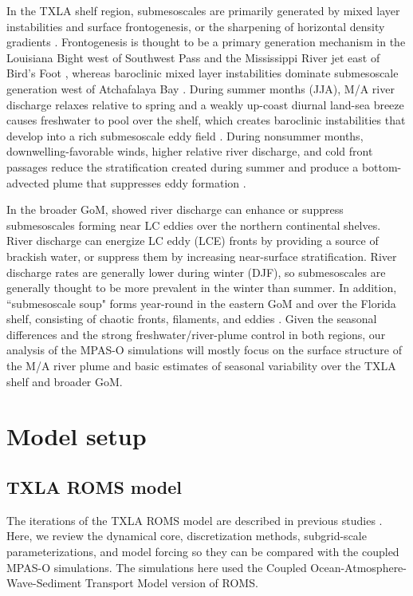 In the TXLA shelf region, submesoscales are primarily generated by mixed layer instabilities and surface frontogenesis, or the sharpening of horizontal density gradients \citep{hoskins1982mathematical, mcwilliams2021oceanic}. Frontogenesis is thought to be a primary generation mechanism in the Louisiana Bight west of Southwest Pass and the Mississippi River jet east of Bird's Foot \citep{Barkan_2017, wang2021structure}, whereas baroclinic mixed layer instabilities dominate submesoscale generation west of Atchafalaya Bay \citep{Hetland_2017, Schlichting23}. During summer months (JJA), M/A river discharge relaxes relative to spring and a weakly up-coast diurnal land-sea breeze causes freshwater to pool over the shelf, which creates baroclinic instabilities that develop into a rich submesoscale eddy field \citep{Hetland_2017, Kobashi_2020, Schlichting23}. During nonsummer months, downwelling-favorable winds, higher relative river discharge, and cold front passages reduce the stratification created during summer and produce a bottom-advected plume that suppresses eddy formation \citep{hetland2012integrated, zhang2014wind}.

In the broader GoM, \citet{barkan2017submesoscalepart2} showed river discharge can enhance or suppress submesoscales forming near LC eddies over the northern continental shelves. River discharge can energize LC eddy (LCE) fronts by providing a source of brackish water, or suppress them by increasing near-surface stratification. River discharge rates are generally lower during winter (DJF), so submesoscales are generally thought to be more prevalent in the winter than summer. In addition, ``submesoscale soup" forms year-round in the eastern GoM and over the Florida shelf, consisting of chaotic fronts, filaments, and eddies \citep{Barkan_2017, liu2021submesoscale}. Given the seasonal differences and the strong freshwater/river-plume control in both regions, our analysis of the MPAS-O simulations will mostly focus on the surface structure of the M/A river plume and basic estimates of seasonal variability over the TXLA shelf and broader GoM. 

\section{Model setup} \label{sec:coupled_setup}
\subsection{TXLA ROMS model}
The iterations of the TXLA ROMS model are described in previous studies \citep{Kobashi_2020, qu2022rapid, Schlichting23}. Here, we review the dynamical core, discretization methods, subgrid-scale parameterizations, and model forcing so they can be compared with the coupled MPAS-O simulations. The simulations here used the Coupled Ocean-Atmosphere-Wave-Sediment Transport Model \citep{Warner_2010} version of ROMS.

